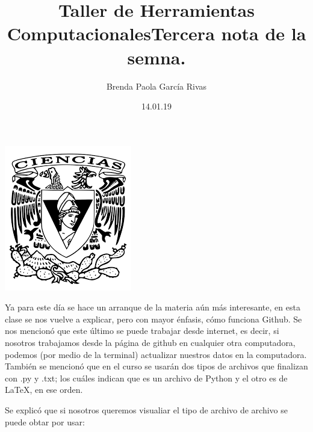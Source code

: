 \documentclass[letterpaper, 12pt, oneside]{article}
\title{\Huge\color{green} Taller de Herramientas Computacionales}
\author{Brenda Paola García Rivas}
\date{14.01.19}
\begin{document}
	\maketitle
	\begin{center}
		\includegraphics[scale=0.95]{1.png}
	\end{center}
	\newpage
	\title{Tercera nota de la semna.\\}
	Ya para este día se hace un arranque de la materia aún más interesante, en esta clase se nos vuelve a explicar, pero con mayor énfasis, cómo funciona Github. Se nos mencionó que este último se puede trabajar desde internet, es decir, si nosotros trabajamos desde la página de github en cualquier otra computadora, podemos (por medio de la terminal) actualizar nuestros datos en la computadora.
	También se mencionó que en el curso se usarán dos tipos de archivos que finalizan con .py y .txt; los cuáles indican que es un archivo de Python y el otro es de LaTeX, en ese orden.
	
	Se explicó que si nosotros queremos visualiar el tipo de archivo de archivo se puede obtar por usar: 
	
\end{document}
